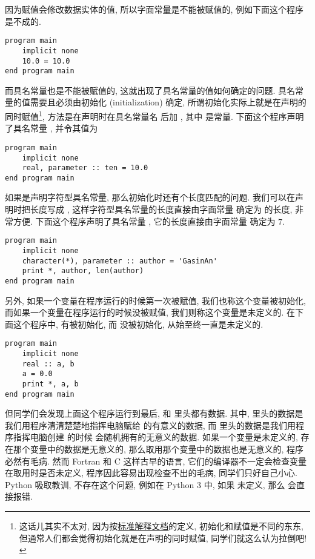 因为赋值会修改数据实体的值, 所以字面常量是不能被赋值的, 例如下面这个程序是不成的.
\begin{lstlisting}
program main
    implicit none
    10.0 = 10.0
end program main
\end{lstlisting}
而具名常量也是不能被赋值的, 这就出现了具名常量的值如何确定的问题. 具名常量的值需要且必须由初始化 (initialization) 确定, 所谓初始化实际上就是在声明的同时赋值\footnote{这话儿其实不太对, 因为按\href{https://j3-fortran.org/doc/year/24/24-007.pdf}{标准解释文档}的定义, 初始化和赋值是不同的东东, 但通常人们都会觉得初始化就是在声明的同时赋值, 同学们就这么认为拉倒吧!}, 方法是在声明时在具名常量名 \ttt{[name]} 后加 \ttt{ = [value]}, 其中 \ttt{[value]} 是常量. 下面这个程序声明了具名常量 , 并令其值为 
\begin{lstlisting}
program main
    implicit none
    real, parameter :: ten = 10.0
end program main
\end{lstlisting}
如果是声明字符型具名常量, 那么初始化时还有个长度匹配的问题. 我们可以在声明时把长度写成 \ttt{*}, 这样字符型具名常量的长度直接由字面常量 \ttt{[value]} 确定为 \ttt{[value]} 的长度, 非常方便. 下面这个程序声明了具名常量 , 它的长度直接由字面常量  确定为 $7$.
\begin{lstlisting}
program main
    implicit none
    character(*), parameter :: author = 'GasinAn'
    print *, author, len(author)
end program main
\end{lstlisting}
另外, 如果一个变量在程序运行的时候第一次被赋值, 我们也称这个变量被初始化, 而如果一个变量在程序运行的时候没被赋值, 我们则称这个变量是未定义的. 在下面这个程序中,  有被初始化, 而  没被初始化, 从始至终一直是未定义的.
\begin{lstlisting}
program main
    implicit none
    real :: a, b
    a = 0.0
    print *, a, b
end program main
\end{lstlisting}
但同学们会发现上面这个程序运行到最后,  和  里头都有数据. 其中,  里头的数据是我们用程序清清楚楚地指挥电脑赋给  的有意义的数据, 而  里头的数据是我们用程序指挥电脑创建  的时候  会随机拥有的无意义的数据. 如果一个变量是未定义的, 存在那个变量中的数据是无意义的, 那么取用那个变量中的数据也是无意义的, 程序必然有毛病. 然而 Fortran 和 C 这样古早的语言, 它们的编译器不一定会检查变量在取用时是否未定义, 程序因此容易出现检查不出的毛病, 同学们只好自己小心. Python 吸取教训, 不存在这个问题, 例如在 Python 3 中, 如果  未定义, 那么  会直接报错.


